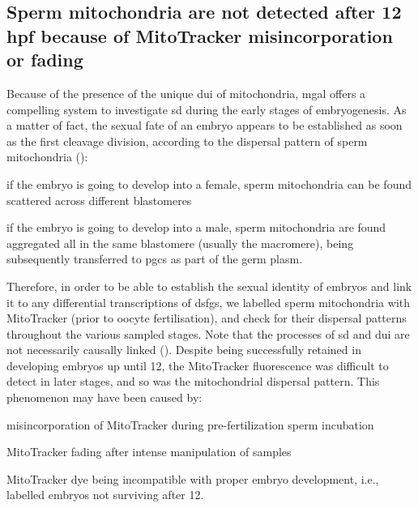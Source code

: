 \subsection{Sperm mitochondria are not detected after 12 hpf because of MitoTracker misincorporation or fading}\label{chapter:insitu-discussionMito}
Because of the presence of the unique \gls{dui} of mitochondria, \gls{mgal} offers a compelling system to investigate \gls{sd} during the early stages of embryogenesis. As a matter of fact, the sexual fate of an embryo appears to be established as soon as the first cleavage division, according to the dispersal pattern of sperm mitochondria ():
\begin{inlinelist}[itemjoin={{; }}]
    \item if the embryo is going to develop into a female, sperm mitochondria can be found scattered across different blastomeres
    \item if the embryo is going to develop into a male, sperm mitochondria are found aggregated all in the same blastomere (usually the macromere), being subsequently transferred to \glspl{pgc} as part of the germ plasm.
\end{inlinelist}    
Therefore, in order to be able to establish the sexual identity of embryos and link it to any differential transcriptions of \glspl{dsfg}, we labelled sperm mitochondria with MitoTracker (prior to oocyte fertilisation), and check for their dispersal patterns throughout the various sampled stages. Note that the processes of \gls{sd} and \gls{dui} are not necessarily causally linked (). Despite being successfully retained in developing embryos up until \qty{12}{\hpf}, the MitoTracker fluorescence was difficult to detect in later stages, and so was the mitochondrial dispersal pattern. This phenomenon may have been caused by:
\begin{inlinelist}[itemjoin={{; }}]
    \item misincorporation of MitoTracker during pre-fertilization sperm incubation
    \item MitoTracker fading after intense manipulation of samples
    \item MitoTracker dye being incompatible with proper embryo development, i.e., labelled embryos not surviving after \qty{12}{\hpf}.
\end{inlinelist}
